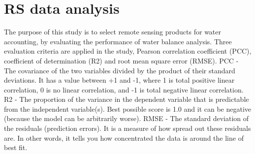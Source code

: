 \documentclass{article}%
\begin{document}
\section{RS data analysis}%
\label{sec:RSdataanalysis}%
The purpose of this study is to select remote sensing products for water accounting, by evaluating the performance of water balance analysis. Three evaluation criteria are applied in the study, Pearson correlation coefficient (PCC), coefficient of determination (R2) and root mean square error (RMSE).%
\linebreak%
PCC - The covariance of the two variables divided by the product of their standard deviations. It has a value between +1 and -1, where 1 is total positive linear correlation, 0 is no linear correlation, and -1 is total negative linear correlation.%
\linebreak%
R2 - The proportion of the variance in the dependent variable that is predictable from the independent variable(s). Best possible score is 1.0 and it can be negative (because the model can be arbitrarily worse).%
\linebreak%
RMSE - The standard deviation of the residuals (prediction errors). It is a measure of how spread out these residuals are. In other words, it tells you how concentrated the data is around the line of best fit.%
\linebreak%
\end{document}
